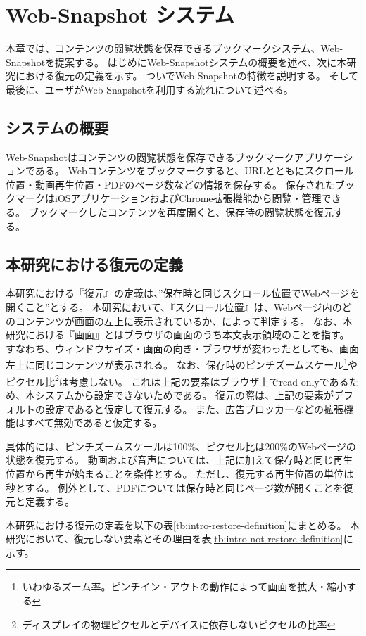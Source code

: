 \chapter{Web-Snapshot システム}
\label{chap:web_snapshot_system}
本章では、コンテンツの閲覧状態を保存できるブックマークシステム、Web-Snapshotを提案する。
はじめにWeb-Snapshotシステムの概要を述べ、次に本研究における復元の定義を示す。
ついでWeb-Snapshotの特徴を説明する。
そして最後に、ユーザがWeb-Snapshotを利用する流れについて述べる。

\section{システムの概要}
Web-Snapshotはコンテンツの閲覧状態を保存できるブックマークアプリケーションである。
Webコンテンツをブックマークすると、URLとともにスクロール位置・動画再生位置・PDFのページ数などの情報を保存する。
保存されたブックマークはiOSアプリケーションおよびChrome拡張機能から閲覧・管理できる。
ブックマークしたコンテンツを再度開くと、保存時の閲覧状態を復元する。

\section{本研究における復元の定義}
\label{chap:web-snapshot-system-restore-definition}
本研究における『復元』の定義は、”保存時と同じスクロール位置でWebページを開くこと”とする。
本研究において、『スクロール位置』は、Webページ内のどのコンテンツが画面の左上に表示されているか、によって判定する。
なお、本研究における『画面』とはブラウザの画面のうち本文表示領域のことを指す。
すなわち、ウィンドウサイズ・画面の向き・ブラウザが変わったとしても、画面左上に同じコンテンツが表示される。
なお、保存時のピンチズームスケール\footnote{いわゆるズーム率。ピンチイン・アウトの動作によって画面を拡大・縮小する}やピクセル比\footnote{ディスプレイの物理ピクセルとデバイスに依存しないピクセルの比率}は考慮しない。
これは上記の要素はブラウザ上でread-only\cite{}であるため、本システムから設定できないためである。
復元の際は、上記の要素がデフォルトの設定であると仮定して復元する。
また、広告ブロッカーなどの拡張機能はすべて無効であると仮定する。


具体的には、ピンチズームスケールは100\%、ピクセル比は200\%のWebページの状態を復元する。
動画および音声については、上記に加えて保存時と同じ再生位置から再生が始まることを条件とする。
ただし、復元する再生位置の単位は秒とする。
例外として、PDFについては保存時と同じページ数が開くことを復元と定義する。

本研究における復元の定義を以下の表\ref{tb:intro-restore-definition}にまとめる。
本研究において、復元しない要素とその理由を表\ref{tb:intro-not-restore-definition}に示す。

